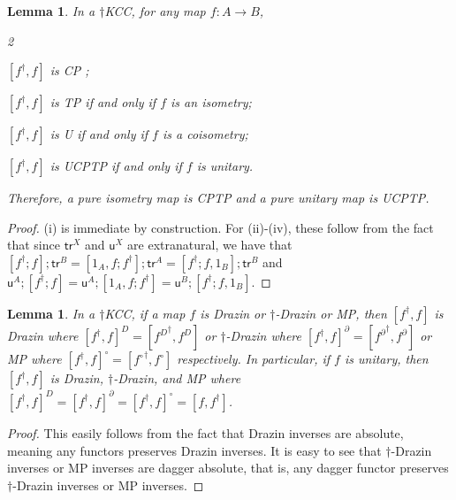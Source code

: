 \documentclass[submission,copyright,creativecommons]{eptcs}
\newtheorem{lemma}[observation]{Lemma}  %
\begin{document}
\begin{lemma} In a $\dagger$KCC, for any map $f: A \to B$, 
\vspace{-0.3cm}
   \begin{enumerate}[(i)]
   \begin{multicols}{2}
\item $[f^\dagger,f]$ is CP \cite[Lem 4.17.(d)]{selinger2007dagger};
\item  $[f^\dagger,f]$ is TP if and only if $f$ is an isometry;
\columnbreak
\item $[f^\dagger,f]$ is U if and only if $f$ is a coisometry;
\item $[f^\dagger,f]$ is UCPTP if and only if $f$ is unitary. 
\end{multicols}
\end{enumerate}
\vspace{-0.3cm}
Therefore, a pure isometry map is CPTP and a pure unitary map is UCPTP. 
\end{lemma}
\begin{proof} (i) is immediate by construction. For (ii)-(iv), these follow from the fact that since $\mathsf{tr}^X$ and $\mathsf{u}^X$ are extranatural, we have that $[f^\dagger;f];\mathsf{tr}^B= [1_A, f;f^\dagger];\mathsf{tr}^A = [f^\dagger;f, 1_B];\mathsf{tr}^B$ and $\mathsf{u}^A;[f^\dagger;f]= \mathsf{u}^A;[1_A, f;f^\dagger] = \mathsf{u}^B;[f^\dagger;f, 1_B]$. 
\end{proof}

\begin{lemma} In a $\dagger$KCC, if a map $f$ is Drazin or $\dagger$-Drazin or MP, then $[f^\dagger, f]$ is Drazin where $[f^\dagger, f]^D = [{f^D}^\dagger, f^D]$ or $\dagger$-Drazin where $[f^\dagger, f]^\partial = [{f^\partial}^\dagger, f^\partial]$ or MP where $[f^\dagger, f]^\circ= [{f^\circ}^\dagger, f^\circ]$ respectively. In particular, if $f$ is unitary, then $[f^\dagger, f]$ is Drazin, $\dagger$-Drazin, and MP where $[f^\dagger, f]^D = [f^\dagger, f]^\partial = [f^\dagger, f]^\circ= [f, f^\dagger]$. 
\end{lemma}
\begin{proof} This easily follows from the fact that Drazin inverses are absolute, meaning any functors preserves Drazin inverses. It is easy to see that $\dagger$-Drazin inverses or MP inverses are dagger absolute, that is, any dagger functor preserves $\dagger$-Drazin inverses or MP inverses.
\end{proof}
\end{document}
